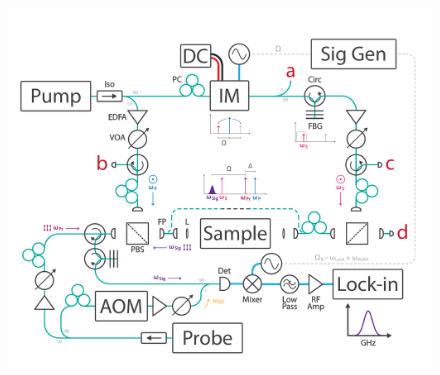 \begin{figure}[htbp]
\centering
\vspace{-20mm}
\includegraphics[width=\textwidth]{figs/4-CABS/Instrument-Design-V1.pdf}
\caption{
}
\end{figure}
